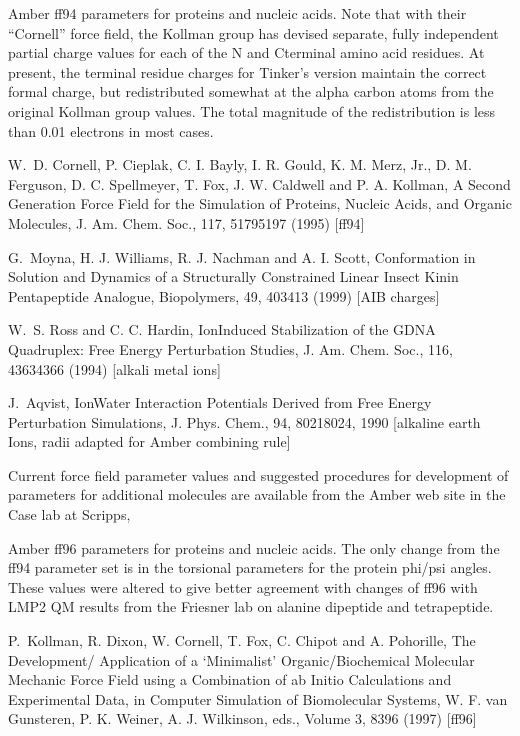 \documentclass[letterpaper,11pt,english]{sphinxmanual}
\begin{document}
\sphinxAtStartPar
Amber ff94 parameters for proteins and nucleic acids. Note that with their “Cornell” force field, the Kollman group has devised separate, fully independent partial charge values for each of the N\sphinxhyphen{} and C\sphinxhyphen{}terminal amino acid residues. At present, the terminal residue charges for Tinker’s version maintain the correct formal charge, but redistributed somewhat at the alpha carbon atoms from the original Kollman group values. The total magnitude of the redistribution is less than 0.01 electrons in most cases.

\sphinxAtStartPar
W. D. Cornell, P. Cieplak, C. I. Bayly, I. R. Gould, K. M. Merz, Jr., D. M. Ferguson, D. C. Spellmeyer, T. Fox, J. W. Caldwell and P. A. Kollman, A Second Generation Force Field for the Simulation of Proteins, Nucleic Acids, and Organic Molecules, J. Am. Chem. Soc., 117, 5179\sphinxhyphen{}5197 (1995)  {[}ff94{]}

\sphinxAtStartPar
G. Moyna, H. J. Williams, R. J. Nachman and A. I. Scott, Conformation in Solution and Dynamics of a Structurally Constrained Linear Insect Kinin Pentapeptide Analogue, Biopolymers, 49, 403\sphinxhyphen{}413 (1999)  {[}AIB charges{]}

\sphinxAtStartPar
W. S. Ross and C. C. Hardin, Ion\sphinxhyphen{}Induced Stabilization of the G\sphinxhyphen{}DNA Quadruplex: Free Energy Perturbation Studies, J. Am. Chem. Soc., 116, 4363\sphinxhyphen{}4366 (1994)   {[}alkali metal ions{]}

\sphinxAtStartPar
J. Aqvist, Ion\sphinxhyphen{}Water Interaction Potentials Derived from Free Energy Perturbation Simulations, J. Phys. Chem., 94, 8021\sphinxhyphen{}8024, 1990  {[}alkaline earth Ions, radii adapted for Amber combining rule{]}

\sphinxAtStartPar
Current force field parameter values and suggested procedures for development of parameters for additional molecules are available from the Amber web site in the Case lab at Scripps, 

\sphinxAtStartPar
{}

\sphinxAtStartPar
Amber ff96 parameters for proteins and nucleic acids. The only change from the ff94 parameter set is in the torsional parameters for the protein phi/psi angles. These values were altered to give better agreement with  changes of ff96 with LMP2 QM results from the Friesner lab on alanine dipeptide and tetrapeptide.

\sphinxAtStartPar
P. Kollman, R. Dixon, W. Cornell, T. Fox, C. Chipot and A. Pohorille, The Development/ Application of a ‘Minimalist’ Organic/Biochemical Molecular Mechanic Force Field using a Combination of ab Initio Calculations and Experimental Data, in Computer Simulation of Biomolecular Systems, W. F. van Gunsteren, P. K. Weiner, A. J. Wilkinson, eds., Volume 3, 83\sphinxhyphen{}96 (1997)  {[}ff96{]}
\end{document}
